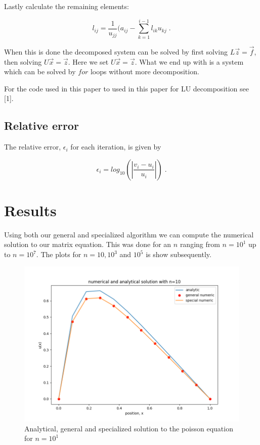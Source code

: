 \documentclass[english,a4paper, 11pt]{article}
\begin{document}
Lastly calculate the remaining elements:

\begin{equation}
l_{ij} = \frac{1}{u_{jj}}(a_{ij} - \sum_{k=1}^{i-1}l_{ik}u_{kj}\;.
\label{LUl}
\end{equation}

When this is done the decomposed system can be solved by first solving $L\vec{z} = \vec{f}$, then solving $U\vec{x} = \vec{z}$. Here we set $U\vec{x} = \vec{z}$. What we end up with is a system which can be solved by $for$ loops without more decomposition.
\newline

For the code used in this paper to used in this paper for LU decomposition see [1].


\subsection{Relative error}
The relative error, $\epsilon_i$ for each iteration, is given by 

\begin{equation}
\epsilon_i = log_{10}(|\frac{v_i - u_i}{u_i}|)\;.
\label{error}
\end{equation}





\section{Results}

Using both our general and specialized algorithm we can compute the numerical solution to our matrix equation. This was done for an $n$ ranging from $n = 10^1$ up to $n = 10^7$. The plots for $n = 10, 10^3$ and $10^5$ is show subsequently.
\begin{figure}[H]
\centering
\includegraphics[scale=0.5]{poisson_n1.png}
\caption{Analytical, general and specialized solution to the poisson equation for $n = 10^1$}\label{fig1}
\end{figure}
\end{document}

